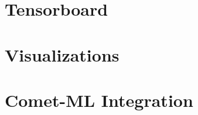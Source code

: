 \documentclass[../../fyp.tex]{subfiles}
\begin{document}
 
\section{Tensorboard}


\section{Visualizations}


\section{Comet-ML Integration}


\end{document}
